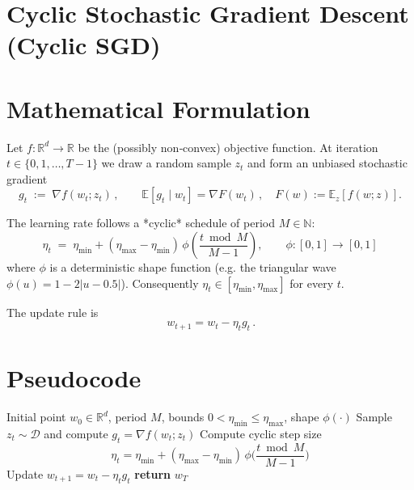 \documentclass{article}
\newcommand{\E}{\mathbb{E}}
\newcommand{\R}{\mathbb{R}}
\begin{document}
\section*{Cyclic Stochastic Gradient Descent (Cyclic SGD)}

\section*{Mathematical Formulation}
Let $f:\R^{d}\rightarrow\R$ be the (possibly non‑convex) objective function.  
At iteration $t\in\{0,1,\dots,T-1\}$ we draw a random sample $z_{t}$ and form an unbiased stochastic gradient
\[
g_{t}\;:=\;\nabla f(w_{t};z_{t})\,,\qquad 
\E\!\left[g_{t}\mid w_{t}\right]=\nabla F(w_{t})\,,\quad 
F(w):=\E_{z}[f(w;z)] .
\]

The learning rate follows a *cyclic* schedule of period $M\in\mathbb{N}$:
\[
\eta_{t}\;=\;\eta_{\min}+(\eta_{\max}-\eta_{\min})\,
\phi\!\left(\frac{t\bmod M}{M-1}\right),\qquad 
\phi:[0,1]\rightarrow[0,1]
\]
where $\phi$ is a deterministic shape function (e.g. the triangular wave
$\phi(u)=1-2|u-0.5|$).  Consequently $\eta_{t}\in[\eta_{\min},\eta_{\max}]$ for every $t$.

The update rule is
\[
\boxed{\,w_{t+1}=w_{t}-\eta_{t}g_{t}\,}.
\]

\section*{Pseudocode}
\begin{algorithm}[H]
\caption{Cyclic SGD}
\begin{algorithmic}[1]
\Require Initial point $w_{0}\in\R^{d}$, period $M$, bounds $0<\eta_{\min}\le\eta_{\max}$, shape $\phi(\cdot)$
    \State Sample $z_{t}\sim\mathcal{D}$ and compute $g_{t}=\nabla f(w_{t};z_{t})$
    \State Compute cyclic step size
    \[
    \eta_{t}= \eta_{\min}+(\eta_{\max}-\eta_{\min})\,
    \phi\!\Big(\frac{t\bmod M}{M-1}\Big)
    \]
    \State Update $w_{t+1}=w_{t}-\eta_{t}g_{t}$
\EndFor
\State \textbf{return} $w_{T}$
\end{algorithmic}
\end{algorithm}
\end{document}
